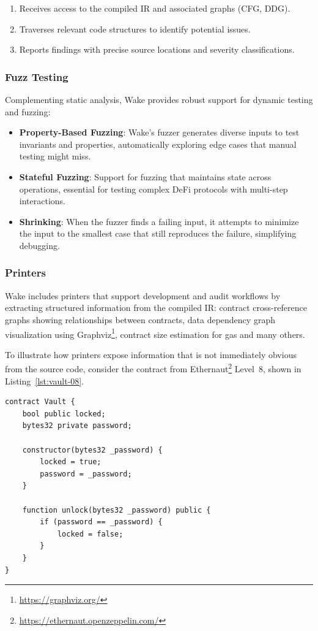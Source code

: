 \begin{enumerate}
    \item Receives access to the compiled IR and associated graphs (CFG, DDG).
    \item Traverses relevant code structures to identify potential issues.
    \item Reports findings with precise source locations and severity classifications.
\end{enumerate}

\subsubsection*{Fuzz Testing}
Complementing static analysis, Wake provides robust support for dynamic testing and fuzzing:

\begin{itemize}
    \item \textbf{Property-Based Fuzzing}: Wake's fuzzer generates diverse inputs to test invariants and properties, automatically exploring edge cases that manual testing might miss.

    \item \textbf{Stateful Fuzzing}: Support for fuzzing that maintains state across operations, essential for testing complex DeFi protocols with multi-step interactions.

    \item \textbf{Shrinking}: When the fuzzer finds a failing input, it attempts to minimize the input to the smallest case that still reproduces the failure, simplifying debugging.
\end{itemize}

\subsubsection*{Printers}
Wake includes printers that support development and audit workflows by extracting structured information from the compiled IR: contract cross-reference graphs showing relationships between contracts, data dependency graph visualization using Graphviz\footnote{\url{https://graphviz.org/}}, contract size estimation for gas and many others.

To illustrate how printers expose information that is not immediately obvious from the source code, consider the contract from Ethernaut\footnote{\url{https://ethernaut.openzeppelin.com/}} Level~8, shown in Listing~\ref{lst:vault-08}.

\begin{listing}[!ht]
\begin{verbatim}
contract Vault {
    bool public locked;
    bytes32 private password;

    constructor(bytes32 _password) {
        locked = true;
        password = _password;
    }

    function unlock(bytes32 _password) public {
        if (password == _password) {
            locked = false;
        }
    }
}
\end{verbatim}
\caption[Ethernaut code example.]{\texttt{Vault} contract that guards access with a \texttt{private} password.}
\label{lst:vault-08}
\end{listing}

